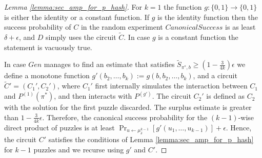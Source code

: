 \begin{proof}[Lemma \ref{lemma:sec_amp_for_p_hash}]
For $k=1$ the function $g: \{0,1\} \rightarrow \{0,1\}$ is either the identity or a constant function.
If $g$ is the identity function then the success probability of $C$ in the random experiment $CanonicalSuccess$ is as least $\delta + \epsilon$,
and $D$ simply uses the circuit $\widetilde{C}$. In case $g$ is a constant function the statement is vacuously true.

In case $Gen$ manages to find an estimate that satisfies $\widetilde{S}_{\pi^*,b} \geq (1-\frac{3}{4k})\epsilon$
we define a monotone function $g'(b_2, \dots, b_k) := g(b, b_2, \dots, b_k)$,
and a circuit $\widetilde{C}' = (C_1', C_2')$, where
$C_1'$ first internally simulates the interaction between $C_1$ and $P^{(1)}(\pi^*)$, and then interacts with $P^{(g')}$.
The circuit $C_2'$ is defined as $C_2$ with the solution for the first puzzle discarded.
The surplus estimate is greater than $1 - \frac{3}{4k}\epsilon$.
Therefore, the canonical success probability for the $(k-1)$-wise direct product of puzzles is at least $\Pr_{u \leftarrow \mu^{k-1}_{\delta}}[g'(u_1,\dots, u_{k-1} )] + \epsilon$.
Hence, the circuit $C'$ satisfies the conditions of Lemma \ref{lemma:sec_amp_for_p_hash} for $k-1$ puzzles and we recurse using $g'$ and $C'$.


\end{proof}
